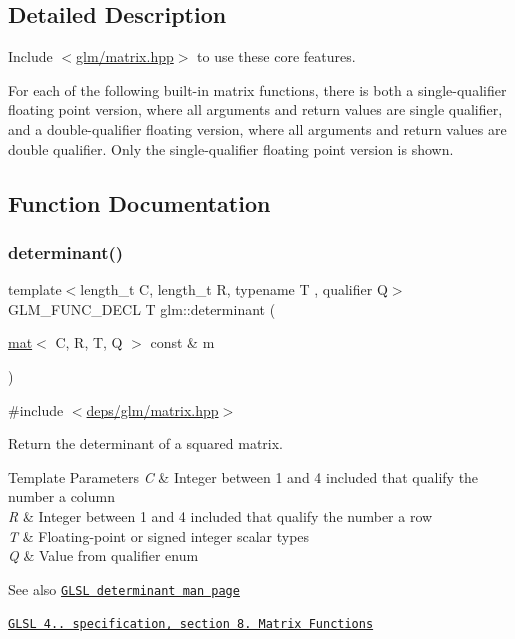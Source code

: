 \subsection{Detailed Description}
Include $<$\hyperlink{matrix_8hpp}{glm/matrix.\+hpp}$>$ to use these core features.

For each of the following built-\/in matrix functions, there is both a single-\/qualifier floating point version, where all arguments and return values are single qualifier, and a double-\/qualifier floating version, where all arguments and return values are double qualifier. Only the single-\/qualifier floating point version is shown. 

\subsection{Function Documentation}
\mbox{\label{group__core__func__matrix_gad7928795124768e058f99dce270f5c8d}} 
\subsubsection{\texorpdfstring{determinant()}{determinant()}}
{\footnotesize\ttfamily template$<$length\+\_\+t C, length\+\_\+t R, typename T , qualifier Q$>$ \\
G\+L\+M\+\_\+\+F\+U\+N\+C\+\_\+\+D\+E\+CL T glm\+::determinant (\begin{DoxyParamCaption}\item[{\hyperlink{structglm_1_1mat}{mat}$<$ C, R, T, Q $>$ const \&}]{m }\end{DoxyParamCaption})}



{\ttfamily \#include $<$\hyperlink{matrix_8hpp}{deps/glm/matrix.\+hpp}$>$}

Return the determinant of a squared matrix.


\begin{DoxyTemplParams}{Template Parameters}
{\em C} & Integer between 1 and 4 included that qualify the number a column \\
\hline
{\em R} & Integer between 1 and 4 included that qualify the number a row \\
\hline
{\em T} & Floating-\/point or signed integer scalar types \\
\hline
{\em Q} & Value from qualifier enum\\
\hline
\end{DoxyTemplParams}
\begin{DoxySeeAlso}{See also}
\href{http://www.opengl.org/sdk/docs/manglsl/xhtml/determinant.xml}{\tt G\+L\+SL determinant man page} 

\href{http://www.opengl.org/registry/doc/GLSLangSpec.4.20.8.pdf}{\tt G\+L\+SL 4.. specification, section 8. Matrix Functions} 
\end{DoxySeeAlso}


